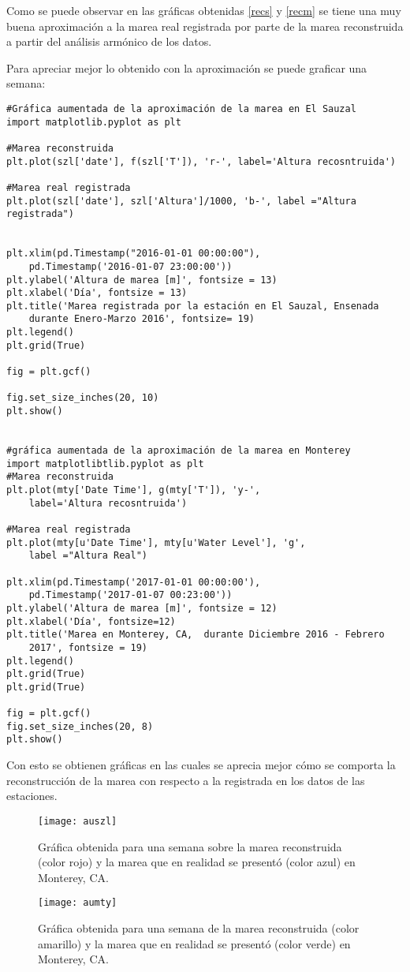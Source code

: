 Como se puede observar en las gráficas obtenidas \ref{recs} y \ref{recm} se tiene una muy buena aproximación a la marea real registrada por parte de la marea reconstruida a partir del análisis armónico de los  datos.

Para apreciar mejor lo obtenido con la aproximación se puede graficar una semana:
\begin{verbatim}
#Gráfica aumentada de la aproximación de la marea en El Sauzal
import matplotlib.pyplot as plt

#Marea reconstruida
plt.plot(szl['date'], f(szl['T']), 'r-', label='Altura recosntruida')
                          
#Marea real registrada
plt.plot(szl['date'], szl['Altura']/1000, 'b-', label ="Altura registrada")
                          
                          
plt.xlim(pd.Timestamp("2016-01-01 00:00:00"), 
	pd.Timestamp('2016-01-07 23:00:00'))
plt.ylabel('Altura de marea [m]', fontsize = 13)
plt.xlabel('Día', fontsize = 13)
plt.title('Marea registrada por la estación en El Sauzal, Ensenada
	durante Enero-Marzo 2016', fontsize= 19)
plt.legend()
plt.grid(True) 

fig = plt.gcf()

fig.set_size_inches(20, 10)
plt.show()


#gráfica aumentada de la aproximación de la marea en Monterey
import matplotlibtlib.pyplot as plt
#Marea reconstruida
plt.plot(mty['Date Time'], g(mty['T']), 'y-', 
	label='Altura recosntruida')

#Marea real registrada
plt.plot(mty[u'Date Time'], mty[u'Water Level'], 'g', 
	label ="Altura Real")

plt.xlim(pd.Timestamp('2017-01-01 00:00:00'), 
	pd.Timestamp('2017-01-07 00:23:00'))
plt.ylabel('Altura de marea [m]', fontsize = 12)
plt.xlabel('Día', fontsize=12)
plt.title('Marea en Monterey, CA,  durante Diciembre 2016 - Febrero 
	2017', fontsize = 19)
plt.legend()
plt.grid(True)
plt.grid(True)

fig = plt.gcf()
fig.set_size_inches(20, 8)
plt.show()
\end{verbatim}
Con esto se obtienen gráficas en las cuales se aprecia mejor cómo se comporta la reconstrucción de la marea con respecto a la registrada en los datos de las estaciones.

\begin{figure}[ht!]
\centering
\texttt{[image: auszl]}
\caption{Gráfica obtenida para una semana sobre la marea reconstruida (color rojo) y la marea que en realidad se presentó (color azul) en Monterey, CA.}
\label{aus}
\end{figure}
\begin{figure}[ht!]
\centering
\texttt{[image: aumty]}
\caption{Gráfica obtenida para una semana de la marea reconstruida (color amarillo) y la marea que en realidad se presentó (color verde) en Monterey, CA.}
\label{aum}
\end{figure}

